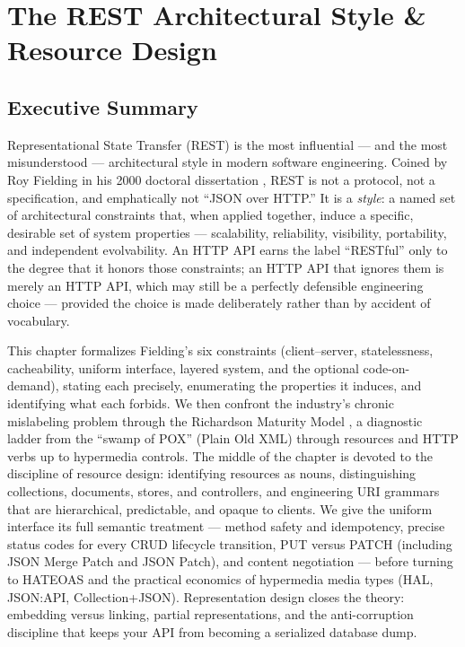 \chapter{The REST Architectural Style \& Resource Design}
\label{ch:rest_style}

\section*{Executive Summary}

Representational State Transfer (REST) is the most influential --- and the most
misunderstood --- architectural style in modern software engineering. Coined by Roy
Fielding in his 2000 doctoral dissertation \cite{fielding2000rest}, REST is not a
protocol, not a specification, and emphatically not ``JSON over HTTP.'' It is a
\emph{style}: a named set of architectural constraints that, when applied together,
induce a specific, desirable set of system properties --- scalability, reliability,
visibility, portability, and independent evolvability. An HTTP API earns the label
``RESTful'' only to the degree that it honors those constraints; an HTTP API that
ignores them is merely an HTTP API, which may still be a perfectly defensible
engineering choice --- provided the choice is made deliberately rather than by
accident of vocabulary.

This chapter formalizes Fielding's six constraints (client--server, statelessness,
cacheability, uniform interface, layered system, and the optional code-on-demand),
stating each precisely, enumerating the properties it induces, and identifying what
each forbids. We then confront the industry's chronic mislabeling problem through the
Richardson Maturity Model \cite{richardson2013restful}, a diagnostic ladder from the
``swamp of POX'' (Plain Old XML) through resources and HTTP verbs up to hypermedia
controls. The middle of the chapter is devoted to the discipline of resource design:
identifying resources as nouns, distinguishing collections, documents, stores, and
controllers, and engineering URI grammars that are hierarchical, predictable, and
opaque to clients. We give the uniform interface its full semantic treatment ---
method safety and idempotency, precise status codes for every CRUD lifecycle
transition, PUT versus PATCH (including JSON Merge Patch and JSON Patch), and content
negotiation --- before turning to HATEOAS and the practical economics of hypermedia
media types (HAL, JSON:API, Collection+JSON). Representation design closes the
theory: embedding versus linking, partial representations, and the anti-corruption
discipline that keeps your API from becoming a serialized database dump.

